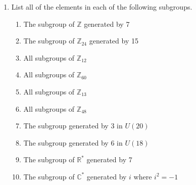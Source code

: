 {\begin{enumerate}
\begin{minipage}[t]{4.6in}
\begin{minipage}[t]{2.25in}
\begin{itemize}
\end{itemize}
\end{minipage} \hfill
\begin{minipage}[t]{2.25in}
\begin{itemize}
 
 \item[{\bf (b)}]
$\sqrt{3} \in {\mathbb R}$
 
 \item[{\bf (d)}]
$-i \in {\mathbb C}^\ast$
 
 \item[{\bf (f)}]
312 in ${\mathbb Z}_{471}$
 
\end{itemize}
\end{minipage}
\end{minipage}
 
\vspace{2pt}        %
 
 
\bf\item\rm
List all of the elements in each of the following subgroups.
\begin{enumerate}
 
 \bf\item\rm
The subgroup of ${\mathbb Z}$ generated by 7
 
 \bf\item\rm
The subgroup of ${\mathbb Z}_{24}$ generated by 15
 
 \bf\item\rm
All subgroups of ${\mathbb Z}_{12}$
 
 \bf\item\rm
All subgroups of ${\mathbb Z}_{60}$
 
 \bf\item\rm
All subgroups of ${\mathbb Z}_{13}$
 
 \bf\item\rm
All subgroups of ${\mathbb Z}_{48}$
 
 \bf\item\rm
The subgroup generated by 3  in $U(20)$
 
 \bf\item\rm
The subgroup generated by 6  in $U(18)$
 
 \bf\item\rm
The subgroup of ${\mathbb R}^\ast$ generated by 7
 
 \bf\item\rm
The subgroup of ${\mathbb C}^\ast$ generated by $i$ where $i^2 = -1$
 

\end{enumerate}
\end{enumerate}}

